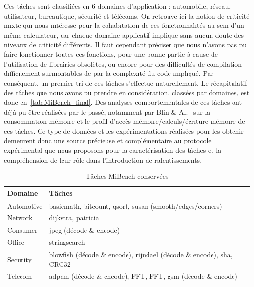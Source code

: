 \documentclass[french, a4paper, 11pt, twoside, pdftex]{StyleThese}
\begin{document}
    
    Ces tâches sont classifiées en 6 domaines d'application : automobile, réseau, utilisateur, bureautique, sécurité et télécoms. On retrouve ici la notion de criticité mixte qui nous intéresse pour la cohabitation de ces fonctionnalités au sein d'un même calculateur, car chaque domaine applicatif implique sans aucun doute des niveaux de criticité différents.
    Il faut cependant préciser que nous n'avons pas pu faire fonctionner toutes ces fonctions, pour une bonne partie à cause de l'utilisation de librairies obsolètes, ou encore pour des difficultés de compilation difficilement surmontables de par la complexité du code impliqué. Par conséquent, un premier tri de ces tâches s'effectue naturellement. Le récapitulatif des tâches que nous avons pu prendre en considération, classées par domaines, est donc en~\autoref{tab:MiBench_final}. Des analyses comportementales de ces tâches ont déjà pu être réalisées par le passé, notamment par Blin \& Al.~\cite{blin_understanding_2016} sur la consommation mémoire et le profil d'accès mémoire/calculs/écriture mémoire de ces tâches. Ce type de données et les expérimentations réalisées pour les obtenir demeurent donc une source précieuse et complémentaire au protocole expérimental que nous proposons pour la caractérisation des tâches et la compréhension de leur rôle dans l'introduction de ralentissements.
    
    \begin{table}[ht!]
    	\renewcommand{\arraystretch}{1.3}
    	\caption{Tâches MiBench conservées}
    	\label{tab:MiBench_final}
    	\centering
    	\begin{tabular}{@{}ll@{}}
    		\toprule
    		Domaine		& Tâches					\\
    		\midrule
    		Automotive  & basicmath, bitcount, qsort, susan (smooth/edges/corners)	\\
    		Network     & dijkstra, patricia                                        \\
    		Consumer    & jpeg (décode \& encode)		                            \\
    		Office      & stringsearch                                              \\
    		Security    & blowfish (décode \& encode), rijndael (décode \& encode), sha, CRC32		\\
    		Telecom     & adpcm (décode \& encode), FFT, FFT\up{-1}, gsm (décode \& encode)   \\
    		\bottomrule
    	\end{tabular}
    \end{table}
\end{document}
